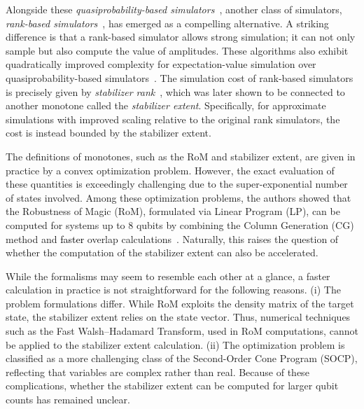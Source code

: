 \documentclass[aps,prx,onecolumn,superscriptaddress,nobibnotes,nofootinbib]{revtex4-2}
\newcommand{\black}[1]{\textcolor{black}{#1}}
\begin{document}
Alongside these {\it quasiprobability-based simulators}~\cite{pashayanEstimatingOutcomeProbabilities2015, PhysRevLett.118.090501, seddonQuantifyingMagicMultiqubit2019, seddonQuantifyingQuantumSpeedups2021}, another class of simulators, {\it rank-based simulators}~\cite{bravyiTradingClassicalQuantum2016,bravyi2016improved,Bravyi2019simulationofquantum, heimendahlStabilizerExtentNot2021, seddonQuantifyingQuantumSpeedups2021}, has emerged as a compelling alternative. A striking difference is that a rank-based simulator allows strong simulation; it can not only sample but also compute the value of amplitudes. These algorithms also exhibit quadratically improved complexity for expectation-value simulation over quasiprobability-based simulators~\cite{bravyi2016improved, seddonQuantifyingQuantumSpeedups2021}.
The simulation cost of rank-based simulators is precisely given by {\it stabilizer rank}~\cite{bravyiTradingClassicalQuantum2016}, which was later shown to be connected to another monotone called the {\it stabilizer extent}. Specifically, for approximate simulations with improved scaling relative to the original rank simulators, the cost is instead bounded by the stabilizer extent.

The definitions of monotones, such as the RoM and stabilizer extent, are given in practice by a convex optimization problem. However, the exact evaluation of these quantities is exceedingly challenging due to the super-exponential number of states involved.
Among these optimization problems, the authors showed that the Robustness of Magic (RoM), formulated via Linear Program (LP), can be computed for systems up to 8 qubits by combining the Column Generation (CG) method and \black{faster} overlap calculations~\cite{Hamaguchi2024handbookquantifying}.
Naturally, this raises the question of whether the computation of the stabilizer extent can also be accelerated.


While the formalisms may seem to resemble each other at a glance, a faster calculation in practice is not straightforward for the following reasons.
(i) The problem formulations differ.
While RoM exploits the density matrix of the target state, the stabilizer extent relies on the state vector. Thus, numerical techniques such as the Fast Walsh--Hadamard Transform, used in RoM computations, cannot be applied to the stabilizer extent calculation. (ii) The optimization problem is classified as a more challenging class of the Second-Order Cone Program (SOCP), reflecting that variables are complex rather than real.
Because of these complications, whether the stabilizer extent can be computed for larger qubit counts has remained unclear.
\end{document}
